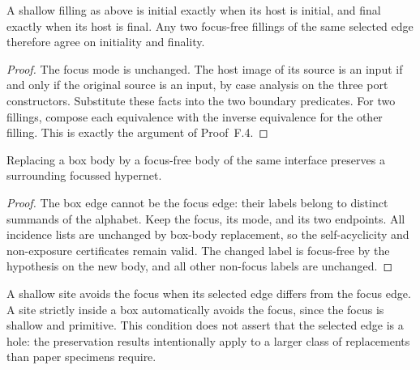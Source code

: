 \begin{lemma}
A shallow filling as above is initial exactly when its host is initial, and
final exactly when its host is final. Any two focus-free fillings of the same
selected edge therefore agree on initiality and finality.
\end{lemma}
\begin{proof}
The focus mode is unchanged. The host image of its source is an input if and
only if the original source is an input, by case analysis on the three port
constructors. Substitute these facts into the two boundary predicates. For two
fillings, compose each equivalence with the inverse equivalence for the other
filling. This is exactly the argument of Proof~F.4.
\end{proof}

\begin{lemma}
Replacing a box body by a focus-free body of the same interface preserves a
surrounding focussed hypernet.
\end{lemma}
\begin{proof}
The box edge cannot be the focus edge: their labels belong to distinct summands
of the alphabet. Keep the focus, its mode, and its two endpoints. All incidence
lists are unchanged by box-body replacement, so the self-acyclicity and
non-exposure certificates remain valid. The changed label is focus-free by the
hypothesis on the new body, and all other non-focus labels are unchanged.
\end{proof}

\begin{definition}\label{term:focus-avoiding-site}
A shallow site avoids the focus when its selected edge differs from the focus
edge. A site strictly inside a box automatically avoids the focus, since the
focus is shallow and primitive. This condition does not assert that the
selected edge is a hole: the preservation results intentionally apply to a
larger class of replacements than paper specimens require.
\end{definition}

